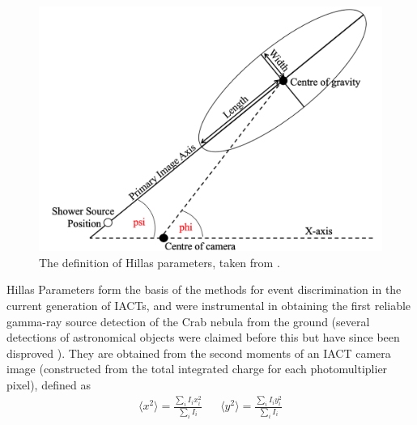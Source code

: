 \begin{figure}[ht] 
        \centering \includegraphics[width=\columnwidth]{figures/hillas.png}
        \caption{
                \label{fig:hillas} %
                The definition of Hillas parameters, taken from \cite{ctapipe}.
        }
\end{figure}
Hillas Parameters form the basis of the methods for event discrimination in the current generation of IACTs, and were instrumental in obtaining the first reliable gamma-ray source detection of the Crab nebula from the ground \cite{whipple} (several detections of astronomical objects were claimed before this but have since been disproved \cite{hintonicrc30} \cite{paulathesis}). They are obtained \cite{tomthesis} \cite{weekestev} from the second moments of an IACT camera image (constructed from the total integrated charge for each photomultiplier pixel), defined as 
\begin{align*}
\langle x^2 \rangle = \frac{\sum_i I_i x_i^2}{\sum_i I_i} && \langle y^2 \rangle = \frac{\sum_i I_i y_i^2}{\sum_i I_i}
\end{align*}
